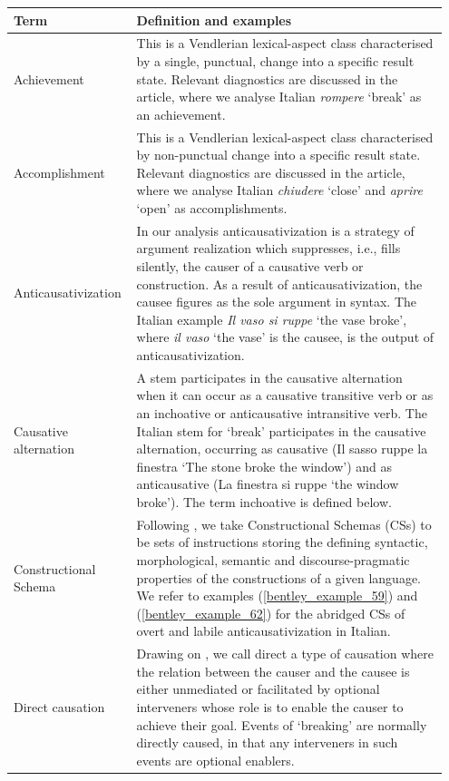\documentclass[output=paper,colorlinks,citecolor=brown
]{langscibook}
\begin{document}
\begin{table}[H]
\begin{tabular}{p{0.25\linewidth}p{0.7\linewidth}}
\lsptoprule
Term                    & Definition   and examples\\
\midrule
Achievement             & This is a Vendlerian   lexical-aspect class characterised by a single, punctual, change into a specific   result state. Relevant diagnostics are discussed in the article, where we   analyse Italian \textit{rompere} ‘break’ as an achievement.   \\
Accomplishment          & This is a Vendlerian   lexical-aspect class characterised by non-punctual change into a specific result   state. Relevant diagnostics are discussed in the article, where we analyse Italian   \textit{chiudere} ‘close’ and \textit{aprire} ‘open’ as accomplishments. \\
Anticausativization     & In our analysis anticausativization   is a strategy of argument realization which suppresses, i.e., fills   silently, the causer of a causative verb or construction. As a result of anticausativization,   the causee figures as the sole argument in syntax. The Italian example \textit{Il   vaso si ruppe} ‘the vase broke’, where \textit{il vaso} ‘the vase’ is the   causee, is the output of anticausativization. \\
Causative   alternation & A stem participates in the causative   alternation when it can occur as a causative transitive verb or as an   inchoative or anticausative intransitive verb. The Italian stem for ‘break’   participates in the causative alternation, occurring as causative (Il sasso   ruppe la finestra ‘The stone broke the window’) and as anticausative (La   finestra si ruppe ‘the window broke’). The term inchoative   is defined below. \\
Constructional   Schema & Following \citet{vanvalin2023principles}, we   take Constructional Schemas (CSs) to be sets of instructions storing   the defining syntactic, morphological, semantic and discourse-pragmatic   properties of the constructions of a given language. We refer to examples (\ref{bentley_example_59})   and (\ref{bentley_example_62}) for the abridged CSs of overt and labile anticausativization in   Italian.   \\
Direct   causation      & Drawing on \citet{wolff2003direct}, we call direct   a type of causation where the relation between the causer and the causee is   either unmediated or facilitated by optional interveners whose role is to   enable the causer to achieve their goal. Events of ‘breaking’ are normally   directly caused, in that any interveners in such events are optional   enablers. \\

\end{tabular}
\end{table}
\end{document}
